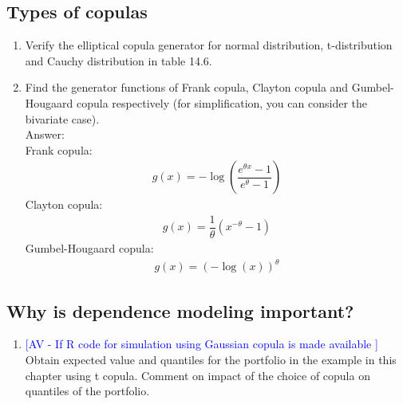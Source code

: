 \documentclass[11pt,a4paper,onecolumn]{article}
\newcommand{\AV}[1]{\textcolor{blue}{[AV - #1 ]\,}}
\begin{document}
\subsection{Types of copulas}
\begin{enumerate}
\item Verify the elliptical copula generator for normal distribution, t-distribution and Cauchy distribution in table 14.6.
\item Find the generator functions of Frank copula, Clayton copula and Gumbel-Hougaard copula respectively (for simplification, you can consider the bivariate case).\\
Answer: \\
Frank copula:
\begin{align*}
g(x) = -\log\left(\dfrac{e^{\theta x}-1}{e^\theta - 1}\right)
\end{align*}
Clayton copula:
\begin{align*}
g(x) = \dfrac{1}{\theta}\left(x^{-\theta} - 1\right)
\end{align*}
Gumbel-Hougaard copula:
\begin{align*}
g(x) = (-\log(x))^\theta
\end{align*}
\end{enumerate}

\subsection{Why is dependence modeling important?}
\begin{enumerate}
\item \AV{If R code for simulation using Gaussian copula is made available} Obtain expected value and quantiles for the portfolio in the example in this chapter using t copula. Comment on impact of the choice of copula on quantiles of the portfolio.
\end{enumerate}
\end{document}
